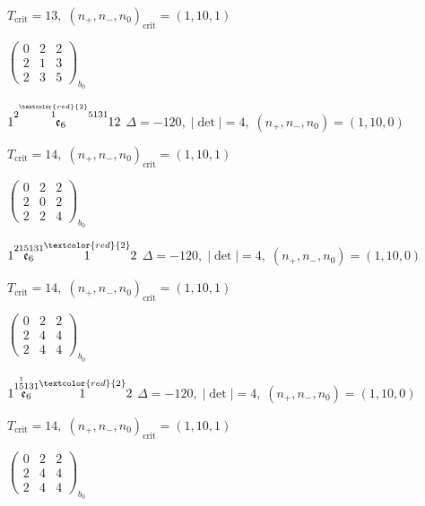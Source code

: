 \documentclass[10pt]{article}
\begin{document}
\hspace{1em}$T_{\text{crit}}=13,\; (n_+,n_-,n_0)_{\text{crit}}=(1,10,1)$

\hspace{2em}$\left(\begin{smallmatrix}0 & 2 & 2 \\ 2 & 1 & 3 \\ 2 & 3 & 5\end{smallmatrix}\right)_{\!b_0}$

\smallskip

$1\overset{2\overset{\textcolor{red}{2}}{1}5131}{\mathfrak{e}_6}12$ \quad $\Delta=-120,\; |\det|=4,\; (n_+,n_-,n_0)=(1,10,0)$

\hspace{1em}$T_{\text{crit}}=14,\; (n_+,n_-,n_0)_{\text{crit}}=(1,10,1)$

\hspace{2em}$\left(\begin{smallmatrix}0 & 2 & 2 \\ 2 & 0 & 2 \\ 2 & 2 & 4\end{smallmatrix}\right)_{\!b_0}$

$1\overset{215131}{\mathfrak{e}_6}\overset{\textcolor{red}{2}}{1}2$ \quad $\Delta=-120,\; |\det|=4,\; (n_+,n_-,n_0)=(1,10,0)$

\hspace{1em}$T_{\text{crit}}=14,\; (n_+,n_-,n_0)_{\text{crit}}=(1,10,1)$

\hspace{2em}$\left(\begin{smallmatrix}0 & 2 & 2 \\ 2 & 4 & 4 \\ 2 & 4 & 4\end{smallmatrix}\right)_{\!b_0}$

\smallskip

$1\overset{1\overset{1}{5}131}{\mathfrak{e}_6}\overset{\textcolor{red}{2}}{1}2$ \quad $\Delta=-120,\; |\det|=4,\; (n_+,n_-,n_0)=(1,10,0)$

\hspace{1em}$T_{\text{crit}}=14,\; (n_+,n_-,n_0)_{\text{crit}}=(1,10,1)$

\hspace{2em}$\left(\begin{smallmatrix}0 & 2 & 2 \\ 2 & 4 & 4 \\ 2 & 4 & 4\end{smallmatrix}\right)_{\!b_0}$
\end{document}
